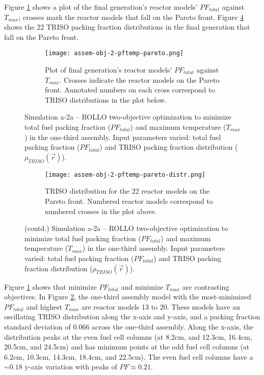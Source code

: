 Figure \ref{fig:assem-obj-2-pftemp-pareto} shows a plot of the final generation's reactor 
models' $PF_{total}$ against $T_{max}$; crosses mark the reactor models that fall on 
the Pareto front.
Figure \ref{fig:assem-obj-2-pftemp-pareto-distr} shows the 22 TRISO packing fraction 
distributions in the final generation that fall on the Pareto front. 
\begin{figure}[htbp!]
    \begin{subfigure}{\textwidth}
        \centering
        \texttt{[image: assem-obj-2-pftemp-pareto.png]}
        \caption{Plot of final generation's reactor models' $PF_{total}$ against 
        $T_{max}$. 
        Crosses indicate the reactor models on the Pareto front. Annotated numbers 
        on each cross correspond to TRISO distributions in the plot below.}
        \label{fig:assem-obj-2-pftemp-pareto} 
    \end{subfigure}
    \caption{Simulation a-2a -- ROLLO two-objective optimization to minimize total fuel 
    packing fraction ($PF_{total}$) and maximum temperature ($T_{max}$) in 
    the one-third assembly. 
    Input parameters varied: total fuel packing fraction ($PF_{total}$) and TRISO 
    packing fraction distribution ($\rho_{TRISO}(\vec{r})$).}
    \label{fig:assem-obj-2-pftemp}
\end{figure}
\begin{figure}[htbp!]
    \ContinuedFloat
    \begin{subfigure}{\textwidth}
        \centering
        \texttt{[image: assem-obj-2-pftemp-pareto-distr.png]}
        \caption{TRISO distribution for the 22 reactor models on the Pareto front.
        Numbered reactor models correspond to numbered crosses in the plot above. }
        \label{fig:assem-obj-2-pftemp-pareto-distr} 
    \end{subfigure}
    \caption{(contd.) Simulation a-2a -- ROLLO two-objective optimization to minimize total fuel 
    packing fraction ($PF_{total}$) and maximum temperature ($T_{max}$) in 
    the one-third assembly. 
    Input parameters varied: total fuel packing fraction ($PF_{total}$) and TRISO 
    packing fraction distribution ($\rho_{TRISO}(\vec{r})$).}
\end{figure}

Figure \ref{fig:assem-obj-2-pftemp-pareto} shows that minimize $PF_{total}$ and 
minimize $T_{max}$ are contrasting objectives. 
In Figure \ref{fig:assem-obj-2-pftemp}, the one-third assembly model with the 
most-minimized $PF_{total}$ and highest $T_{max}$ are reactor models 13 to 20. 
These models have an oscillating TRISO distribution along the 
x-axis and y-axis, and a packing fraction standard deviation of $0.066$ across the 
one-third assembly. 
Along the x-axis, the distribution peaks at the even fuel cell columns (at 8.2cm,  
and 12.3cm, 16.4cm, 20.5cm, and 24.5cm) and has minimum points at the odd fuel cell 
columns (at 6.2cm, 10.3cm, 14.3cm, 18.4cm, and 22.5cm).
The even fuel cell columns have a ${\sim}0.18$ y-axis variation with peaks of 
$PF\approx0.21$. 

